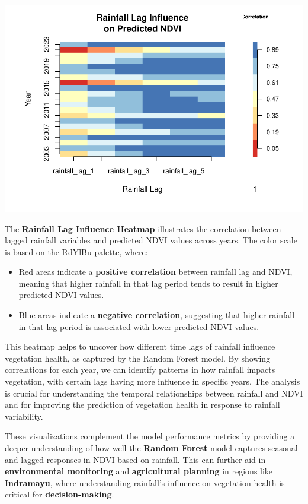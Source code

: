 \documentclass[
]{article}
\providecommand{\tightlist}{%
  \setlength{\itemsep}{0pt}\setlength{\parskip}{0pt}}
\begin{document}
\begin{center}\includegraphics{BI_VegetationResponse_Project_HarvardX_Ph125_9x_files/figure-latex/vis_rainfall_influence_heatmap-1} \end{center}

The \textbf{Rainfall Lag Influence Heatmap} illustrates the correlation
between lagged rainfall variables and predicted NDVI values across
years. The color scale is based on the RdYlBu palette, where:

\begin{itemize}
\tightlist
\item
  Red areas indicate a \textbf{positive correlation} between rainfall
  lag and NDVI, meaning that higher rainfall in that lag period tends to
  result in higher predicted NDVI values.
\item
  Blue areas indicate a \textbf{negative correlation}, suggesting that
  higher rainfall in that lag period is associated with lower predicted
  NDVI values.
\end{itemize}

This heatmap helps to uncover how different time lags of rainfall
influence vegetation health, as captured by the Random Forest model. By
showing correlations for each year, we can identify patterns in how
rainfall impacts vegetation, with certain lags having more influence in
specific years. The analysis is crucial for understanding the temporal
relationships between rainfall and NDVI and for improving the prediction
of vegetation health in response to rainfall variability.

These visualizations complement the model performance metrics by
providing a deeper understanding of how well the \textbf{Random Forest}
model captures seasonal and lagged responses in NDVI based on rainfall.
This can further aid in \textbf{environmental monitoring} and
\textbf{agricultural planning} in regions like \textbf{Indramayu}, where
understanding rainfall's influence on vegetation health is critical for
\textbf{decision-making}.
\end{document}
